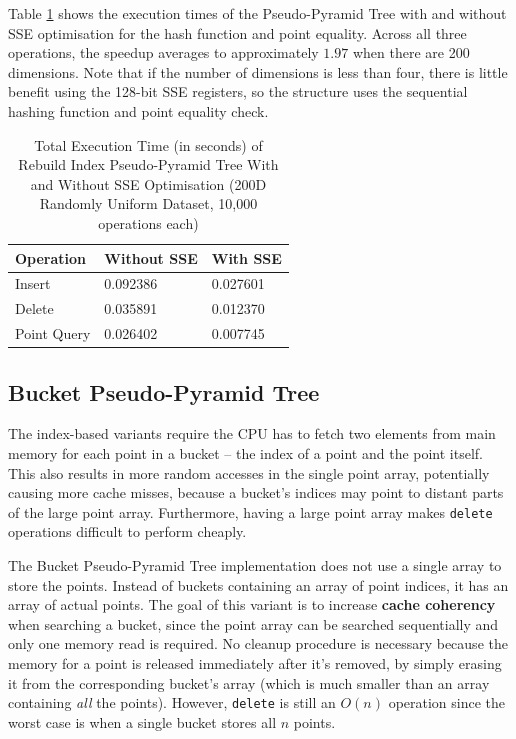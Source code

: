 Table \ref{tab:pseudo-pyramid-sse} shows the execution times of the Pseudo-Pyramid Tree with and without SSE optimisation for the hash function and point equality. Across all three operations, the speedup averages to approximately $1.97$ when there are 200 dimensions. Note that if the number of dimensions is less than four, there is little benefit using the 128-bit SSE registers, so the structure uses the sequential hashing function and point equality check.

\begin{table}
	\centering
	\begin{tabular}{|l|l|l|}
		\hline
		\textbf{Operation} & \textbf{Without SSE} & \textbf{With SSE} \\
		\hline
		Insert & 0.092386 & 0.027601 \\
		Delete & 0.035891 & 0.012370 \\
		Point Query & 0.026402 & 0.007745 \\
		\hline
	\end{tabular}
	\caption{Total Execution Time (in seconds) of Rebuild Index Pseudo-Pyramid Tree With and Without SSE Optimisation (200D Randomly Uniform Dataset, 10,000 operations each)}
	\label{tab:pseudo-pyramid-sse}
\end{table}

\subsection{Bucket Pseudo-Pyramid Tree}

The index-based variants require the CPU has to fetch two elements from main memory for each point in a bucket -- the index of a point and the point itself. This also results in more random accesses in the single point array, potentially causing more cache misses, because a bucket's indices may point to distant parts of the large point array. Furthermore, having a large point array makes \texttt{delete} operations difficult to perform cheaply.

The Bucket Pseudo-Pyramid Tree implementation does not use a single array to store the points. Instead of buckets containing an array of point indices, it has an array of actual points. The goal of this variant is to increase \textbf{cache coherency} when searching a bucket, since the point array can be searched sequentially and only one memory read is required. No cleanup procedure is necessary because the memory for a point is released immediately after it's removed, by simply erasing it from the corresponding bucket's array (which is much smaller than an array containing \textit{all} the points). However, \texttt{delete} is still an $O(n)$ operation since the worst case is when a single bucket stores all $n$ points.

